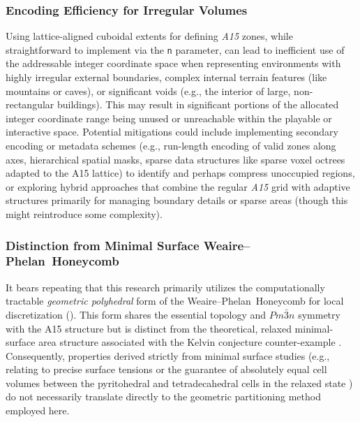 \documentclass[10pt]{article}
\def\AAAB{\textit{A15}}
\def\WP{Weaire--Phelan}
\def\WPH{\WP{}~Honeycomb}
\begin{document}
\subsubsection{Encoding Efficiency for Irregular Volumes}\label{subsubsec-limits-complex}
Using lattice-aligned cuboidal extents for defining \AAAB{} zones, while straightforward to implement via the \texttt{n} parameter, can lead to inefficient use of the addressable integer coordinate space when representing environments with highly irregular external boundaries, complex internal terrain features (like mountains or caves), or significant voids (e.g., the interior of large, non-rectangular buildings). This may result in significant portions of the allocated integer coordinate range being unused or unreachable within the playable or interactive space. Potential mitigations could include implementing secondary encoding or metadata schemes (e.g., run-length encoding of valid zones along axes, hierarchical spatial masks, sparse data structures like sparse voxel octrees adapted to the A15 lattice) to identify and perhaps compress unoccupied regions, or exploring hybrid approaches that combine the regular \AAAB{} grid with adaptive structures primarily for managing boundary details or sparse areas (though this might reintroduce some complexity).

\subsubsection{Distinction from Minimal Surface \WPH{}}\label{subsubsec-limits-wp-form}
It bears repeating that this research primarily utilizes the computationally tractable \emph{geometric polyhedral} form of the \WPH{} for local discretization (). This form shares the essential topology and $Pm\bar{3}n$ symmetry with the A15 structure but is distinct from the theoretical, relaxed minimal-surface area structure associated with the Kelvin conjecture counter-example \cite{WeairePhelan1994}. Consequently, properties derived strictly from minimal surface studies (e.g., relating to precise surface tensions or the guarantee of absolutely equal cell volumes between the pyritohedral and tetradecahedral cells in the relaxed state \cite{Kusner1996}) do not necessarily translate directly to the geometric partitioning method employed here.
\end{document}
